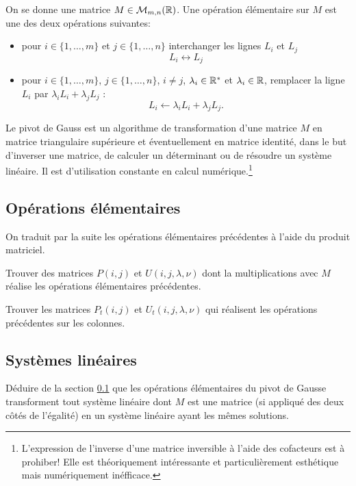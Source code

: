 \documentclass[11pt, a4paper]{article}
\begin{document}
On se donne une matrice $M \in \mathcal{M}_{m, n}(\mathbb{R})$. Une opération
élémentaire sur $M$ est une des deux opérations suivantes:
\begin{itemize}
\item
  pour $i \in \{1, \ldots, m\}$ et $j \in \{1, \ldots, n\}$
  interchanger les lignes $L_i$ et $L_j$
  \[
  L_i \leftrightarrow L_j
  \]
\item
  pour $i \in \{1, \ldots, m\}$, $j \in \{1, \ldots, n\}$, $i \neq j$,
  $\lambda_i \in \mathbb{R}^*$ et $\lambda_i \in \mathbb{R}$, remplacer la ligne $L_i$
  par $\lambda_i L_i + \lambda_jL_j$ :
  \[
  L_i \leftarrow \lambda_iL_i + \lambda_jL_j.
  \]
\end{itemize}
Le pivot de Gauss est un algorithme de transformation d'une matrice
$M$ en matrice triangulaire supérieure et éventuellement en matrice
identité, dans le but d'inverser une matrice, de calculer un
déterminant ou de résoudre un système linéaire. Il est d'utilisation
constante en calcul numérique.\footnote{L'expression de l'inverse
  d'une matrice inversible à l'aide des cofacteurs est à prohiber!
  Elle est théoriquement intéressante et particulièrement esthétique
  mais numériquement inéfficace.}

\subsection{Opérations élémentaires}
\label{subsec:opElementaires}

On traduit par la suite les opérations élémentaires précédentes à
l'aide du produit matriciel.
\begin{question}
  Trouver des matrices $P(i, j)$ et $U(i, j, \lambda, \nu)$ dont la
  multiplications avec $M$ réalise les opérations élémentaires
  précédentes.
\end{question}

\begin{question}
  Trouver les matrices $P_t(i, j)$ et $U_t(i, j, \lambda, \nu)$ qui
  réalisent les opérations précédentes sur les colonnes.
\end{question}

\subsection{Systèmes linéaires}

\begin{question}
  Déduire de la section \ref{subsec:opElementaires} que les opérations
  élémentaires du pivot de Gausse transforment tout système linéaire
  dont $M$ est une matrice (si appliqué des deux côtés de l'égalité)
  en un système linéaire ayant les mêmes solutions.
\end{question}
\end{document}
